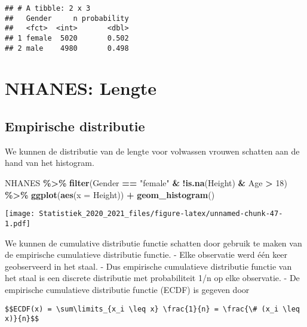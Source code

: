 \documentclass[
  12pt,dutch,coursenotes]{book}
\newenvironment{Shaded}{\begin{snugshade}}{\end{snugshade}}
\newcommand{\DataTypeTok}[1]{\textcolor[rgb]{0.13,0.29,0.53}{#1}}
\newcommand{\DecValTok}[1]{\textcolor[rgb]{0.00,0.00,0.81}{#1}}
\newcommand{\KeywordTok}[1]{\textcolor[rgb]{0.13,0.29,0.53}{\textbf{#1}}}
\newcommand{\NormalTok}[1]{#1}
\newcommand{\OperatorTok}[1]{\textcolor[rgb]{0.81,0.36,0.00}{\textbf{#1}}}
\newcommand{\StringTok}[1]{\textcolor[rgb]{0.31,0.60,0.02}{#1}}
\theoremstyle{definition}
\theoremstyle{definition}
\theoremstyle{definition}
\theoremstyle{remark}
\begin{document}
\begin{verbatim}
## # A tibble: 2 x 3
##   Gender     n probability
##   <fct>  <int>       <dbl>
## 1 female  5020       0.502
## 2 male    4980       0.498
\end{verbatim}

\hypertarget{nhanes-lengte}{%
\section{NHANES: Lengte}\label{nhanes-lengte}}

\hypertarget{empirische-distributie}{%
\subsection{Empirische distributie}\label{empirische-distributie}}

We kunnen de distributie van de lengte voor volwassen vrouwen schatten aan de hand van het histogram.

\begin{Shaded}
\begin{Highlighting}[]
\NormalTok{NHANES }\OperatorTok{\%\textgreater{}\%}\StringTok{ }\KeywordTok{filter}\NormalTok{(Gender }\OperatorTok{==}\StringTok{ "female"} \OperatorTok{\&}\StringTok{ }\OperatorTok{!}\KeywordTok{is.na}\NormalTok{(Height) }\OperatorTok{\&}\StringTok{ }
\StringTok{    }\NormalTok{Age }\OperatorTok{\textgreater{}}\StringTok{ }\DecValTok{18}\NormalTok{) }\OperatorTok{\%\textgreater{}\%}\StringTok{ }\KeywordTok{ggplot}\NormalTok{(}\KeywordTok{aes}\NormalTok{(}\DataTypeTok{x =}\NormalTok{ Height)) }\OperatorTok{+}\StringTok{ }\KeywordTok{geom\_histogram}\NormalTok{()}
\end{Highlighting}
\end{Shaded}

\texttt{[image: Statistiek\_2020\_2021\_files/figure-latex/unnamed-chunk-47-1.pdf]}

We kunnen de cumulative distributie functie schatten door gebruik te maken van de empirische cumulatieve distributie functie.
- Elke observatie werd één keer geobserveerd in het staal.
- Dus empirische cumulatieve distributie functie van het staal is een discrete distributie met probabiliteit 1/n op elke observatie.
- De empirische cumulatieve distributie functie (ECDF) is gegeven door

\begin{verbatim}
$$ECDF(x) = \sum\limits_{x_i \leq x} \frac{1}{n} = \frac{\# (x_i \leq x)}{n}$$
\end{verbatim}
\end{document}
